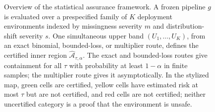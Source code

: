 \begin{figure}[!t]
	\caption{Overview of the statistical assurance framework. A frozen pipeline $g$ is
        evaluated over a prespecified family of $K$ deployment environments indexed by
        missingness severity $m$ and distribution-shift severity $s$. One simultaneous
        upper band $(U_1,\ldots,U_K)$, from an exact binomial, bounded-loss, or multiplier
        route, defines the certified inner region $\widehat{\mathcal A}_{\tau,\alpha}$. The
        exact and bounded-loss routes give containment for all $\tau$ with probability at
        least $1-\alpha$ in finite samples; the multiplier route gives it asymptotically. In
        the stylized map, green cells are certified, yellow cells have estimated risk at most
        $\tau$ but are not certified, and red cells are not certified; neither uncertified
        category is a proof that the environment is unsafe.}
	\label{fig:overview}
\end{figure}
